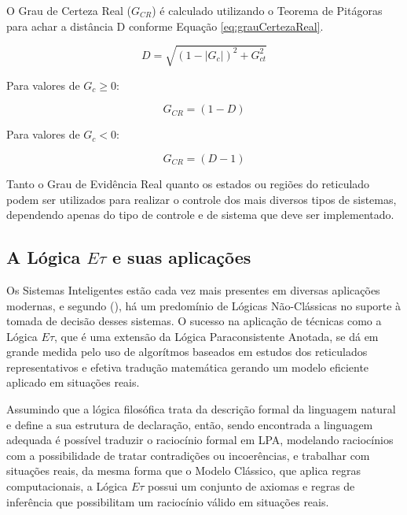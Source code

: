 O Grau de Certeza Real ($G_{CR}$) 
é calculado utilizando o Teorema de Pitágoras para achar a distância D 
conforme Equação \ref{eq:grauCertezaReal}. 

\begin{center}
\begin{equation}
D = \sqrt{(1-|G_c|)^2+G_{ct}^2}
\label{eq:grauCertezaReal}
\end{equation}
\end{center}

Para valores de $G_c \geq 0$: 

\begin{center}
\begin{equation}
G_{CR} = (1-D)
\end{equation}
\end{center}

Para valores de $G_c < 0$:

\begin{center}
\begin{equation}
G_{CR} = (D-1)
\end{equation}
\end{center}


Tanto o Grau de Evidência Real quanto os estados ou regiões do reticulado 
podem ser utilizados para realizar o controle dos mais diversos tipos de sistemas, 
dependendo apenas do tipo de controle e de sistema que deve ser implementado. 

\subsection{A Lógica $E\tau$ e suas aplicações}

Os Sistemas Inteligentes estão cada vez mais presentes 
em diversas aplicações modernas, 
e segundo \citeauthor{JISF2011}(\citeyear{JISF2011}), 
há um predomínio de Lógicas Não-Clássicas no suporte à tomada de decisão desses sistemas. 
O sucesso na aplicação de técnicas como a Lógica $E\tau$, 
que é uma extensão da Lógica Paraconsistente Anotada, 
se dá em grande medida pelo uso de 
algorítmos baseados em estudos dos reticulados representativos e 
efetiva tradução matemática 
gerando um modelo eficiente aplicado em situações reais.

Assumindo que a lógica filosófica trata da descrição formal da linguagem natural 
e define a sua estrutura de declaração, então, 
sendo encontrada a linguagem adequada 
é possível traduzir o raciocínio formal em LPA, 
modelando raciocínios com a possibilidade de 
tratar contradições ou incoerências, 
e trabalhar com situações reais, 
da mesma forma que o Modelo Clássico, 
que aplica regras computacionais, 
a Lógica $E\tau$ possui um conjunto de axiomas e regras de inferência 
que possibilitam um raciocínio válido em situações reais.

